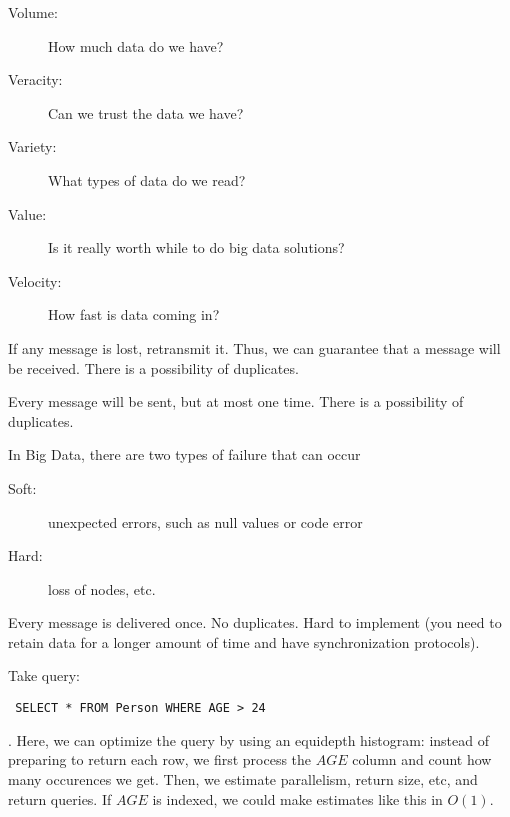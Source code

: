 \begin{definition}\label{def:fiveV}
    \begin{description}
        \item[Volume:] How much data do we have?
        \item[Veracity:] Can we trust the data we have?
        \item[Variety:] What types of data do we read?
        \item[Value:] Is it really worth while to do big data solutions?
        \item[Velocity:] How fast is data coming in?
    \end{description}
\end{definition}

\begin{definition}\label{def:atleastonce}
    If any message is lost, retransmit it. Thus, we can guarantee that a message will be received.
    There is a possibility of duplicates.
\end{definition}

\begin{definition}\label{def:atmostonce}
    Every message will be sent, but at most one time.
    There is a possibility of duplicates.
\end{definition}

\begin{definition}
    In Big Data, there are two types of failure that can occur
    \begin{description}
        \item[Soft:] unexpected errors, such as null values or code error
        \item[Hard:] loss of nodes, etc.
    \end{description}
\end{definition}

\begin{definition}\label{def:exactlyonce}
    Every message is delivered once. No duplicates. Hard to implement (you need to retain data for a longer amount of time and have synchronization protocols).
\end{definition}

\begin{definition}\label{def:equidepthhistogram}
Take query: 
\begin{verbatim} SELECT * FROM Person WHERE AGE > 24 \end{verbatim}.
Here, we can optimize the query by using an equidepth histogram:
instead of preparing to return each row, we first process the $AGE$ column and count 
how many occurences we get. Then, we estimate parallelism, return size, etc, and return queries.
If $AGE$ is indexed, we could make estimates like  this in $O(1)$.
\end{definition}

